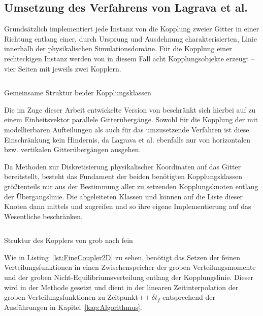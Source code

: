 \newpage
\subsection{Umsetzung des Verfahrens von Lagrava et al.}

Grundsätzlich implementiert jede Instanz von  die Kopplung zweier Gitter in einer Richtung entlang einer, durch Ursprung und Ausdehnung charakterisierten, Linie innerhalb der physikalischen Simulationsdomäne. Für die Kopplung einer rechteckigen  Instanz werden von  in diesem Fall acht Kopplungsobjekte erzeugt -- vier Seiten mit jeweils zwei Kopplern.

\begin{listing}[H]
\inputminted{cpp}{code/coupler2d.cpp}
\caption{Gemeinsame Struktur beider Kopplungsklassen}
\label{lst:Coupler2D}
\end{listing}

Die im Zuge dieser Arbeit entwickelte Version von  beschränkt sich hierbei auf zu einem Einheitsvektor parallele Gitterübergänge. Sowohl für die Kopplung der mit  modellierbaren Aufteilungen als auch für das umzusetzende Verfahren ist diese Einschränkung kein Hindernis, da Lagrava et al. ebenfalls nur von horizontalen bzw. vertikalen Gitterübergängen ausgehen.

Da  Methoden zur Diskretisierung physikalischer Koordinaten auf das Gitter bereitstellt, besteht das Fundament der beiden benötigten Kopplungsklassen größtenteils nur aus der Bestimmung aller zu setzenden Kopplungsknoten entlang der Übergangslinie. Die abgeleiteten Klassen  und  können auf die Liste dieser Knoten dann mittels  und  zugreifen und so ihre eigene Implementierung auf das Wesentliche beschränken.

\begin{listing}[H]
\inputminted{cpp}{code/fineCoupler2d.cpp}
\caption{Struktur des Kopplers von grob nach fein}
\label{lst:FineCoupler2D}
\end{listing}

Wie in Listing~\ref{lst:FineCoupler2D} zu sehen, benötigt das Setzen der feinen Verteilungsfunktionen in  einen Zwischenspeicher der groben Verteilungsmomente und der groben Nicht-Equilibriumsverteilung entlang der Kopplungslinie. Dieser wird in der Methode  gesetzt und dient in  der linearen Zeitinterpolation der groben Verteilungsfunktionen zu Zeitpunkt \(t+\delta t_f\) entsprechend der Ausführungen in Kapitel~\ref{kap:Algorithmus}.

